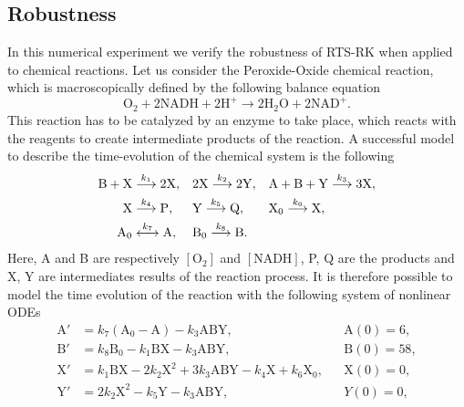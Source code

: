 \documentclass[final,onefignum,onetabnum]{siamonline171218}
\begin{document}
\subsection{Robustness} In this numerical experiment we verify the robustness of RTS-RK when applied to chemical reactions. Let us consider the Peroxide-Oxide chemical reaction, which is macroscopically defined by the following balance equation
\begin{equation}
	\mathrm{O}_2 + 2\mathrm{NADH} + 2\mathrm{H}^+ \to 2\mathrm{H}_2\mathrm{O} + 2\mathrm{NAD}^+.
\end{equation}
This reaction has to be catalyzed by an enzyme to take place, which reacts with the reagents to create intermediate products of the reaction. A successful model \cite{Ols83} to describe the time-evolution of the chemical system is the following
\begin{equation}
\begin{aligned}
	\mathrm{B} + \mathrm{X} &\stackrel{k_1}{\longrightarrow} 2 \mathrm{X}, 
	&&2\mathrm{X} \stackrel{k_2}{\longrightarrow} 2\mathrm{Y}, 
	&&\mathrm{A} + \mathrm{B} + \mathrm{Y} \stackrel{k_3}{\longrightarrow} 3 \mathrm{X}, \\
	\mathrm{X} &\stackrel{k_4}{\longrightarrow} \mathrm{P}, 
	&&\mathrm{Y} \stackrel{k_5}{\longrightarrow} \mathrm{Q}, 
	&&\mathrm{X_0} \stackrel{k_6}{\longrightarrow} \mathrm{X}, \\
	\mathrm{A_0} &\stackrel{k_7}{\longleftrightarrow} \mathrm{A}, 
	&&\mathrm{B_0} \stackrel{k_8}{\longrightarrow} \mathrm{B}.
\end{aligned}
\end{equation}
Here, A and B are respectively $[\mathrm{O}_2]$ and $[\mathrm{NADH}]$, P, Q are the products and X, Y are intermediates results of the reaction process. It is therefore possible to model the time evolution of the reaction with the following system of nonlinear ODEs 
\begin{equation}\label{eq:PeroxOx}
\begin{aligned}
	\mathrm{A}' &= k_7  (\mathrm{A}_0 - \mathrm{A}) - k_3  \mathrm{A}\mathrm{B}\mathrm{Y}, &&\mathrm{A}(0) = 6, \\
	\mathrm{B}' &= k_8\mathrm{B}_0 - k_1  \mathrm{B}\mathrm{X} - k_3  \mathrm{A}\mathrm{B}\mathrm{Y}, &&\mathrm{B}(0) = 58, \\
	\mathrm{X}' &= k_1  \mathrm{B}\mathrm{X} - 2  k_2  \mathrm{X}^2 + 3  k_3 \mathrm{A}\mathrm{B}\mathrm{Y} - k_4  \mathrm{X} + k_6\mathrm{X}_0,&& \mathrm{X}(0) = 0, \\
	\mathrm{Y}' &= 2  k_2  \mathrm{X}^2 - k_5  \mathrm{Y} - k_3  \mathrm{A}\mathrm{B}\mathrm{Y}, && Y(0) = 0,
\end{aligned}
\end{equation}
\end{document}
